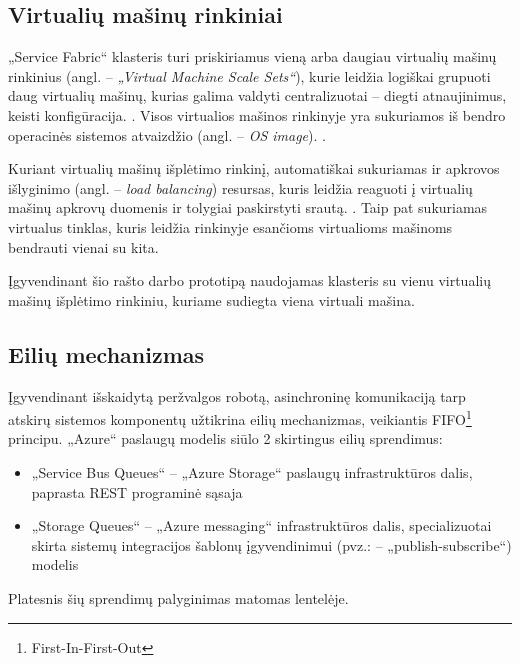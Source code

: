 \subsection{Virtualių mašinų rinkiniai}

„Service Fabric“ klasteris turi priskiriamus vieną arba daugiau virtualių mašinų rinkinius (angl. -- \textit{„Virtual Machine Scale Sets“}), kurie leidžia logiškai grupuoti daug virtualių mašinų, kurias galima valdyti centralizuotai -- diegti atnaujinimus, keisti konfigūracija. \cite{VirtualMachineScaleSets}. Visos virtualios mašinos rinkinyje yra sukuriamos iš bendro operacinės sistemos atvaizdžio (angl. -- \textit{OS image}). \cite{VirtualMachineScaleSets}.

Kuriant virtualių mašinų išplėtimo rinkinį, automatiškai sukuriamas ir apkrovos išlyginimo (angl. -- \textit{load balancing}) resursas, kuris leidžia reaguoti į virtualių mašinų apkrovų duomenis ir tolygiai paskirstyti srautą. \cite{VirtualMachineScaleSets}. Taip pat sukuriamas virtualus tinklas, kuris leidžia rinkinyje esančioms virtualioms mašinoms bendrauti vienai su kita.

Įgyvendinant šio rašto darbo prototipą naudojamas klasteris su vienu virtualių mašinų išplėtimo rinkiniu, kuriame sudiegta viena virtuali mašina.

\pagebreak

\subsection{Eilių mechanizmas}

Įgyvendinant išskaidytą peržvalgos robotą, asinchroninę komunikaciją tarp atskirų sistemos komponentų užtikrina eilių mechanizmas, veikiantis FIFO\footnote{First-In-First-Out} principu. „Azure“ paslaugų modelis siūlo 2 skirtingus eilių sprendimus:
\begin{itemize}
    \item „Service Bus Queues“ -- „Azure Storage“ paslaugų infrastruktūros dalis, paprasta REST programinė sąsaja \cite{QueuesStorageVsServiceBus}
    \item „Storage Queues“ -- „Azure messaging“ infrastruktūros dalis, specializuotai skirta sistemų integracijos šablonų įgyvendinimui (pvz.: -- „publish-subscribe“) modelis \cite{QueuesStorageVsServiceBus}
\end{itemize}

Platesnis šių sprendimų palyginimas matomas lentelėje.



